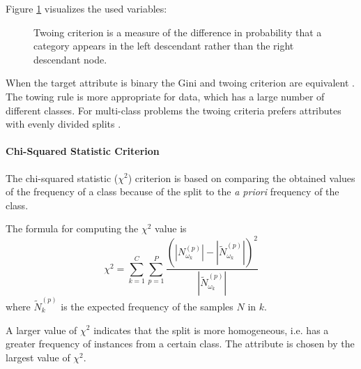 Figure \ref{fig:twoingcriterion} visualizes the used variables:

\begin{figure}[!h] \centering
{}
\caption{Twoing criterion is a measure of the difference in probability that a category appears in the left descendant rather than the right descendant node. }
\label{fig:twoingcriterion}
\end{figure}

When the target attribute is binary the Gini and twoing criterion are equivalent \cite{shih1999families}. The towing rule is more appropriate for data, which has a large number of different classes. For multi-class problems the twoing criteria prefers attributes with evenly divided splits \cite[p. 57]{rokach2008data}.


\paragraph{Chi-Squared Statistic Criterion}

The chi-squared statistic ($\chi^2$) criterion is based on comparing the obtained values of the frequency of a class because of the split to the \textit{a priori} frequency of the class. 

\begin{definition}
The formula for computing the $\chi^2$ value is 
\begin{equation}
    \chi^2 = \sum_{k=1}^{C}\sum_{p=1}^{P} \frac{\left(\left| N_{\omega_k}^{(p)} \right| - \left| \tilde N_{\omega_k}^{(p)} \right| \right) ^2 }{ \left| \tilde N_{\omega_k}^{(p)} \right| }
\end{equation}
where $\tilde N_k^{(p)}$ is the expected frequency of the samples $N$ in $k$.
\end{definition}

A larger value of $\chi^2$ indicates that the split is more homogeneous, i.e. has a greater frequency of instances from a certain class. The attribute is chosen by the largest value of $\chi^2$.








